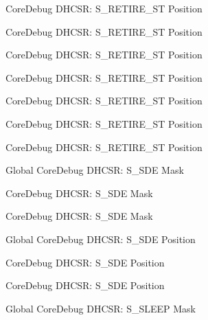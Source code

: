 \begin{DoxyRefList}
\label{deprecated__deprecated000165}%
%
Core\+Debug DHCSR\+: S\+\_\+\+RETIRE\+\_\+\+ST Position 

\label{deprecated__deprecated000564}%
%
Core\+Debug DHCSR\+: S\+\_\+\+RETIRE\+\_\+\+ST Position 

\label{deprecated__deprecated000111}%
%
Core\+Debug DHCSR\+: S\+\_\+\+RETIRE\+\_\+\+ST Position 

\label{deprecated__deprecated000383}%
%
Core\+Debug DHCSR\+: S\+\_\+\+RETIRE\+\_\+\+ST Position 

\label{deprecated__deprecated000307}%
%
Core\+Debug DHCSR\+: S\+\_\+\+RETIRE\+\_\+\+ST Position 

\label{deprecated__deprecated000250}%
%
Core\+Debug DHCSR\+: S\+\_\+\+RETIRE\+\_\+\+ST Position 

\label{deprecated__deprecated000011}%
%
Core\+Debug DHCSR\+: S\+\_\+\+RETIRE\+\_\+\+ST Position  
\item[Global \doxylink{group___c_m_s_i_s___s_c_b_ga67f2b2b6729ab2db89f97bbe75224e9d}{Core\+Debug\+\_\+\+DHCSR\+\_\+\+S\+\_\+\+SDE\+\_\+\+Msk} ]\label{deprecated__deprecated000573}%
%
Core\+Debug DHCSR\+: S\+\_\+\+SDE Mask 

\label{deprecated__deprecated000471}%
%
Core\+Debug DHCSR\+: S\+\_\+\+SDE Mask 

\label{deprecated__deprecated000020}%
%
Core\+Debug DHCSR\+: S\+\_\+\+SDE Mask  
\item[Global \doxylink{group___c_m_s_i_s___s_c_b_ga34b00f5a0109d236647be6609d6f04b3}{Core\+Debug\+\_\+\+DHCSR\+\_\+\+S\+\_\+\+SDE\+\_\+\+Pos} ]\label{deprecated__deprecated000019}%
%
Core\+Debug DHCSR\+: S\+\_\+\+SDE Position 

\label{deprecated__deprecated000470}%
%
Core\+Debug DHCSR\+: S\+\_\+\+SDE Position 

\label{deprecated__deprecated000572}%
%
Core\+Debug DHCSR\+: S\+\_\+\+SDE Position  
\item[Global \doxylink{group___c_m_s_i_s___core_debug_ga98d51538e645c2c1a422279cd85a0a25}{Core\+Debug\+\_\+\+DHCSR\+\_\+\+S\+\_\+\+SLEEP\+\_\+\+Msk} ]\label{deprecated__deprecated000475}%
%
Core\+Debug DHCSR\+: S\+\_\+\+SLEEP Mask 


\end{DoxyRefList}
